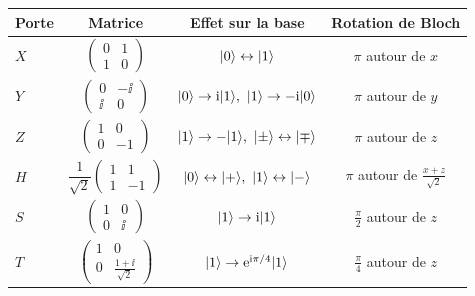 \begin{center}
\renewcommand{\arraystretch}{1}
\begin{tabular}{@{}lccc@{}}
\toprule
\textbf{Porte} & \textbf{Matrice} & \textbf{Effet sur la base} & \textbf{Rotation de Bloch} \\
\midrule
$X$ & $\begin{pmatrix}0 & 1\\ 1 & 0\end{pmatrix}$ & $|0\rangle\leftrightarrow|1\rangle$ & $\pi$ autour de $x$ \\[2.2ex]
$Y$ & $\begin{pmatrix}0 & -\ii\\ \ii & 0\end{pmatrix}$ & $\ket{0}\to\ii\ket{1},\ \ket{1}\to-\ii\ket{0}$ & $\pi$ autour de $y$ \\[2.2ex]
$Z$ & $\begin{pmatrix}1 & 0\\ 0 & -1\end{pmatrix}$ & $\ket{1}\to-\ket{1},\ \ket{\pm}\leftrightarrow\ket{\mp}$ & $\pi$ autour de $z$ \\[2.2ex]
$H$ & $\dfrac{1}{\sqrt2}\begin{pmatrix}1 & 1\\ 1 & -1\end{pmatrix}$ & $\ket{0}\leftrightarrow\ket{+},\ \ket{1}\leftrightarrow\ket{-}$ & $\pi$ autour de $\frac{x+z}{\sqrt2}$ \\[2.2ex]
$S$ & $\begin{pmatrix}1 & 0\\ 0 & \ii\end{pmatrix}$ & $|1\rangle\to\mathrm{i}|1\rangle$ & $\frac\pi2$ autour de $z$ \\[2.2ex]
$T$ & $\begin{pmatrix}1 & 0\\ 0 & \frac{1+\ii}{\sqrt2}\end{pmatrix}$ & $|1\rangle\to\mathrm{e}^{\mathrm{i}\pi/4}|1\rangle$ & $\frac\pi4$ autour de $z$ \\
\bottomrule
\end{tabular}
\end{center}

